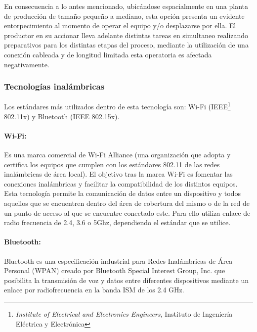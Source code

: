                 \par En consecuencia a lo antes mencionado, ubicándose espacialmente en una planta de producción de tamaño pequeño a mediano, esta opción presenta un evidente entorpecimiento al momento de operar el equipo  y/o desplazarse por ella. El productor en su accionar lleva adelante distintas tareas en simultaneo realizando preparativos para los distintas etapas del proceso, mediante la utilización de una conexión cableada y de longitud limitada esta operatoria es afectada negativamente.
                
            \subsubsection{Tecnologías inalámbricas}
                \par Los estándares más utilizados dentro de esta tecnología son: Wi-Fi\textsuperscript{\textregistered} (IEEE\footnote{ \textit{Institute of Electrical and Electronics Engineers}, Instituto de Ingeniería Eléctrica y Electrónica} 802.11x) y Bluetooth\textsuperscript{\textregistered} (IEEE 802.15x).
                \paragraph{Wi-Fi\textsuperscript{\textregistered}:} Es una marca comercial de Wi-Fi Alliance (una organización que adopta y certifica los equipos que cumplen con los estándares 802.11 de las redes inalámbricas de área local). El objetivo tras la marca Wi-Fi\textsuperscript{\textregistered} es fomentar las conexiones inalámbricas y facilitar la compatibilidad de los distintos equipos. Esta tecnología permite la comunicación de datos entre un dispositivo y todos aquellos que se encuentren dentro del área de cobertura del mismo o de la red de un punto de acceso al que se encuentre conectado este. Para ello utiliza enlace de radio frecuencia de 2.4, 3.6 o 5Ghz, dependiendo el estándar que se utilice.
                \paragraph{Bluetooth\textsuperscript{\textregistered}:} Bluetooth\textsuperscript{\textregistered} es una especificación industrial para Redes Inalámbricas de Área Personal (WPAN) creado por Bluetooth Special Interest Group, Inc. que posibilita la transmisión de voz y datos entre diferentes dispositivos mediante un enlace por radiofrecuencia en la banda ISM de los 2.4 GHz.
                
